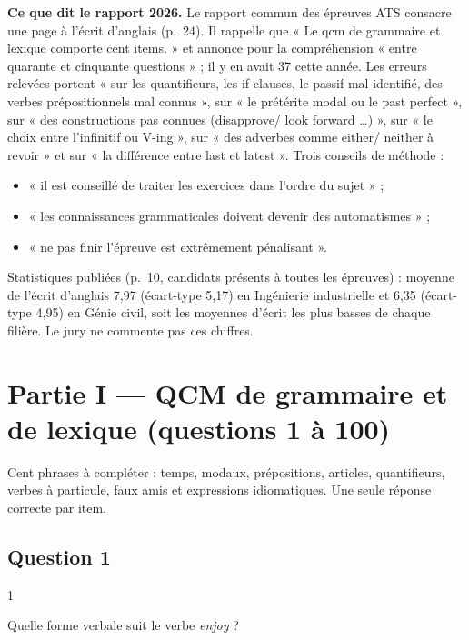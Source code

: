 \documentclass[11pt,a4paper]{article}
\providecommand{\tightlist}{\setlength{\itemsep}{0pt}\setlength{\parskip}{0pt}}
\begin{document}
\textbf{Ce que dit le rapport 2026.} Le rapport commun des épreuves ATS consacre une page à l'écrit d'anglais (p.~24). Il rappelle que « Le qcm de grammaire et lexique comporte cent items. » et annonce pour la compréhension « entre quarante et cinquante questions » ; il y en avait 37 cette année. Les erreurs relevées portent « sur les quantifieurs, les if-clauses, le passif mal identifié, des verbes prépositionnels mal connus », sur « le prétérite modal ou le past perfect », sur « des constructions pas connues (disapprove/ look forward \ldots) », sur « le choix entre l'infinitif ou V-ing », sur « des adverbes comme either/ neither à revoir » et sur « la différence entre last et latest ». Trois conseils de méthode :

\begin{itemize}
\tightlist
\item
  « il est conseillé de traiter les exercices dans l'ordre du sujet » ;
\item
  « les connaissances grammaticales doivent devenir des automatismes » ;
\item
  « ne pas finir l'épreuve est extrêmement pénalisant ».
\end{itemize}

Statistiques publiées (p.~10, candidats présents à toutes les épreuves) : moyenne de l'écrit d'anglais 7,97 (écart-type 5,17) en Ingénierie industrielle et 6,35 (écart-type 4,95) en Génie civil, soit les moyennes d'écrit les plus basses de chaque filière. Le jury ne commente pas ces chiffres.

\hypertarget{partie-i-qcm-de-grammaire-et-de-lexique-questions-1-uxe0-100}{%
\section{Partie I --- QCM de grammaire et de lexique (questions 1 à 100)}\label{partie-i-qcm-de-grammaire-et-de-lexique-questions-1-uxe0-100}}

Cent phrases à compléter : temps, modaux, prépositions, articles, quantifieurs, verbes à particule, faux amis et expressions idiomatiques. Une seule réponse correcte par item.

\hypertarget{question-1}{%
\subsection{Question 1}\label{question-1}}

\begin{indication}{1}

Quelle forme verbale suit le verbe \emph{enjoy} ?

\end{indication}
\end{document}
